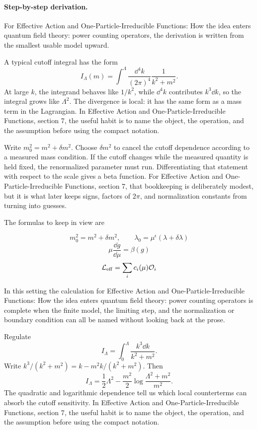 \paragraph{Step-by-step derivation.}

For Effective Action and One-Particle-Irreducible Functions: How the idea enters quantum field theory: power counting operators, the derivation is written from the smallest usable model upward.

A typical cutoff integral has the form
\[
  I_\Lambda(m)=\int^{\Lambda}\frac{\dd^4k}{(2\pi)^4}\frac{1}{k^2+m^2}.
\]
At large \(k\), the integrand behaves like \(1/k^2\), while \(\dd^4k\) contributes \(k^3\dd k\), so the integral grows like \(\Lambda^2\).  The divergence is local: it has the same form as a mass term in the Lagrangian.  In Effective Action and One-Particle-Irreducible Functions, section 7, the useful habit is to name the object, the operation, and the assumption before using the compact notation.

Write \(m_0^2=m^2+\delta m^2\).  Choose \(\delta m^2\) to cancel the cutoff dependence according to a measured mass condition.  If the cutoff changes while the measured quantity is held fixed, the renormalized parameter must run.  Differentiating that statement with respect to the scale gives a beta function.  For Effective Action and One-Particle-Irreducible Functions, section 7, that bookkeeping is deliberately modest, but it is what later keeps signs, factors of \(2\pi\), and normalization constants from turning into guesses.

The formulas to keep in view are

\[
  m_0^2=m^2+\delta m^2,\qquad \lambda_0=\mu^\epsilon(\lambda+\delta\lambda)
\]
\[
  \mu\frac{\dd g}{\dd\mu}=\beta(g)
\]
\[
  \mathcal L_{\mathrm{eff}}=\sum_i c_i(\mu)\mathcal O_i
\]

In this setting the calculation for Effective Action and One-Particle-Irreducible Functions: How the idea enters quantum field theory: power counting operators is complete when the finite model, the limiting step, and the normalization or boundary condition can all be named without looking back at the prose.




\begin{example}
Regulate
\[
  I_\Lambda=\int_0^\Lambda\frac{k^3\dd k}{k^2+m^2}.
\]
Write \(k^3/(k^2+m^2)=k-m^2k/(k^2+m^2)\).  Then
\[
  I_\Lambda=\frac12\Lambda^2-\frac{m^2}{2}\log\frac{\Lambda^2+m^2}{m^2}.
\]
The quadratic and logarithmic dependence tell us which local counterterms can absorb the cutoff sensitivity.  In Effective Action and One-Particle-Irreducible Functions, section 7, the useful habit is to name the object, the operation, and the assumption before using the compact notation.
\end{example}



